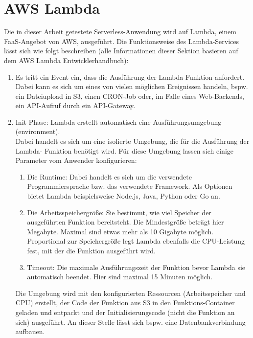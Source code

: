 \section{AWS Lambda}
Die in dieser Arbeit getestete Serverless-Anwendung wird auf Lambda, einem \ac{FaaS}-Angebot von \ac{AWS}, ausgeführt. Die Funktionsweise des Lambda-Services lässt sich wie folgt beschreiben (alle Informationen dieser Sektion basieren auf dem \ac{AWS} Lambda Entwicklerhandbuch\cite{amazon_aws_aws_2020}):

\begin{enumerate}
\item Es tritt ein Event ein, dass die Ausführung der Lambda-Funktion anfordert. \\
    Dabei kann es sich um eines von vielen möglichen Ereignissen handeln, bspw. ein Dateiupload in \ac{S3}, einen CRON-Job oder, im Falle eines Web-Backends, ein API-Aufruf durch ein API-Gateway.

\item Init Phase: Lambda erstellt automatisch eine Ausführungsumgebung (environment). \\
    Dabei handelt es sich um eine isolierte Umgebung, die für die Ausführung der Lambda- Funktion benötigt wird. Für diese Umgebung lassen sich einige Parameter vom Anwender konfigurieren:
    
    \begin{enumerate}
        \item Die Runtime: Dabei handelt es sich um die verwendete Programmiersprache bzw. das verwendete Framework. Als Optionen bietet Lambda beispielsweise Node.js, Java, Python oder Go an.
        \item Die Arbeitsspeichergröße: Sie bestimmt, wie viel Speicher der ausgeführten Funktion bereitsteht. Die Mindestgröße beträgt hier  Megabyte. Maximal sind etwas mehr als 10 Gigabyte möglich. Proportional zur Speichergröße legt Lambda ebenfalls die CPU-Leistung fest, mit der die Funktion ausgeführt wird.
        \item Timeout: Die maximale Ausführungszeit der Funktion bevor Lambda sie automatisch beendet. Hier sind maximal 15 Minuten möglich.
    \end{enumerate}
    
    Die Umgebung wird mit den konfigurierten Ressourcen (Arbeitsspeicher und CPU) erstellt, der Code der Funktion aus \ac{S3} in den Funktions-Container geladen und entpackt und der Initialisierungscode (nicht die Funktion an sich) ausgeführt. An dieser Stelle lässt sich bspw. eine Datenbankverbindung aufbauen.
    

\end{enumerate}
